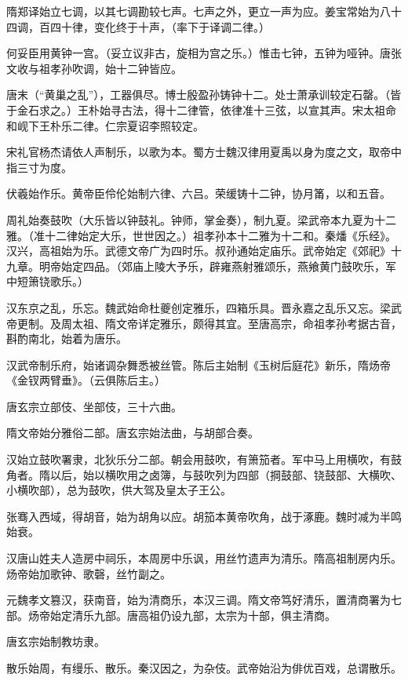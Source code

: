 \documentclass[a4paper,12pt,UTF8,twoside]{ctexbook}
\begin{document}
    隋郑译始立七调，以其七调勘较七声。七声之外，更立一声为应。姜宝常始为八十四调，百四十律，变化终于十声，（率下于译调二律。）
    
    何妥臣用黄钟一宫。（妥立议非古，旋相为宫之乐。）惟击七钟，五钟为哑钟。唐张文收与祖孝孙吹调，始十二钟皆应。
    
    唐末（“黄巢之乱”），工器俱尽。博士殷盈孙铸钟十二。处士萧承训较定石罄。（皆于金石求之。）王朴始寻古法，得十二律管，依律准十三弦，以宣其声。宋太祖命和岘下王朴乐二律。仁宗夏诏李照较定。
    
    宋礼官杨杰请依人声制乐，以歌为本。蜀方士魏汉律用夏禹以身为度之文，取帝中指三寸为度。
    
    伏羲始作乐。黄帝臣伶伦始制六律、六吕。荣缓铸十二钟，协月筩，以和五音。
    
    周礼始奏鼓吹（大乐皆以钟鼓礼。钟师，掌金奏），制九夏。梁武帝本九夏为十二雅。（准十二律始定大乐，世世因之。）祖孝孙本十二雅为十二和。秦燔《乐经》。汉兴，高祖始为乐。武德文帝广为四时乐。叔孙通始定庙乐。武帝始定《郊祀》十九章。明帝始定四品。（郊庙上陵大予乐，辟雍燕射雅颂乐，燕飨黄门鼓吹乐，军中短箫铙歌乐。）
    
    汉东京之乱，乐忘。魏武始命杜夔创定雅乐，四箱乐具。晋永嘉之乱乐又忘。梁武帝更制。及周太祖、隋文帝详定雅乐，颇得其宜。至唐高宗，命祖孝孙考据古音，斟酌南北，始着为唐乐。
    
    汉武帝制乐府，始诸调杂舞悉被丝管。陈后主始制《玉树后庭花》新乐，隋炀帝《金钗两臂垂》。（云俱陈后主。）
    
    唐玄宗立部伎、坐部伎，三十六曲。
    
    隋文帝始分雅俗二部。唐玄宗始法曲，与胡部合奏。
    
    汉始立鼓吹署隶，北狄乐分二部。朝会用鼓吹，有箫笳者。军中马上用横吹，有鼓角者。隋以后，始以横吹用之卤簿，与鼓吹列为四部（掆鼓部、铙鼓部、大横吹、小横吹部），总为鼓吹，供大驾及皇太子王公。
    
    张骞入西域，得胡音，始为胡角以应。胡笳本黄帝吹角，战于涿鹿。魏时减为半鸣始衰。
    
    汉唐山姓夫人造房中祠乐，本周房中乐讽，用丝竹遗声为清乐。隋高祖制房内乐。炀帝始加歌钟、歌磬，丝竹副之。
    
    元魏孝文篡汉，获南音，始为清商乐，本汉三调。隋文帝笃好清乐，置清商署为七部。炀帝始定清乐九部。唐高祖仍设九部，太宗为十部，俱主清商。
    
    唐玄宗始制教坊隶。
    
    散乐始周，有缦乐、散乐。秦汉因之，为杂伎。武帝始沿为俳优百戏，总谓散乐。
    
\end{document}
